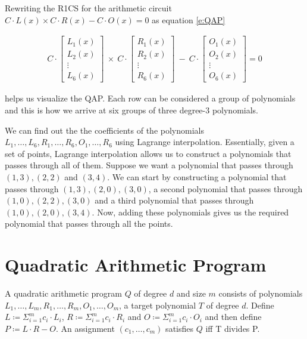 \documentclass[twoside]{article}
\begin{document}
Rewriting the R1CS for the arithmetic circuit 
$C\cdot L(x) \times C\cdot R(x) - C\cdot O(x) = 0$ as equation \ref{e:QAP}

\begin{align}
C \cdot \begin{bmatrix}
L_1(x) \\
L_2(x) \\
\vdots \\
L_6(x)
\end{bmatrix} ~\times~  C \cdot \begin{bmatrix}
R_1(x) \\
R_2(x) \\
\vdots \\
R_6(x)
\end{bmatrix} ~-~ C\cdot \begin{bmatrix}
O_1(x) \\
O_2(x) \\
\vdots \\
O_6(x)
\end{bmatrix} = 0
\label{e:QAP}
\end{align}

helps us visualize the QAP. Each row can be considered a group of polynomials and this is how we arrive at 
six groups of three degree-3 polynomials.

We can find out the the coefficients of the polynomials $L_1, \ldots, L_6, R_1, \ldots, R_6, O_1, \ldots, R_6$ using Lagrange interpolation.
Essentially, given a set of points, Lagrange interpolation allows us to construct a polynomials that passes through all of them.
Suppose we want a polynomial that passes through $(1, 3), (2, 2)$ and $(3, 4)$. We can start by constructing a polynomial that passes through
$(1, 3), (2, 0), (3, 0)$, a second polynomial that passes through $(1, 0), (2, 2), (3, 0)$ and a third polynomial that passes
through $(1, 0), (2, 0), (3, 4)$. Now, adding these polynomials gives us the required polynomial that passes through all the points.


\section{Quadratic Arithmetic Program}

A quadratic arithmetic program $Q$ of degree $d$ and size $m$ consists of polynomials $L_1, \ldots, L_m, R_1, \ldots, R_m, O_1, \ldots, O_m$,
a target polynomial $T$ of degree $d$.
Define $L \coloneqq \Sigma_{i=1}^{m} c_i\cdot L_i$, $R \coloneqq \Sigma_{i=1}^{m} c_i\cdot R_i$ and $O \coloneqq \Sigma_{i=1}^{m} c_i\cdot O_i$ and then 
define $P \coloneqq L \cdot R - O$. An assignment $(c_1, \ldots, c_m)$ satisfies $Q$ iff T divides P.



\end{document}
